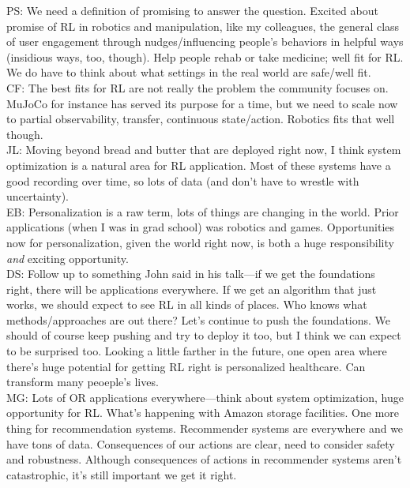 PS: We need a definition of promising to answer the question. Excited about promise of RL in robotics and manipulation, like my colleagues, the general class of user engagement through nudges/influencing people's behaviors in helpful ways (insidious ways, too, though). Help people rehab or take medicine; well fit for RL. We do have to think about what settings in the real world are safe/well fit. \\

CF: The best fits for RL are not really the problem the community focuses on. MuJoCo for instance has served its purpose for a time, but we need to scale now to partial observability, transfer, continuous state/action. Robotics fits that well though. \\

JL: Moving beyond bread and butter that are deployed right now, I think system optimization is a natural area for RL application. Most of these systems have a good recording over time, so lots of data (and don't have to wrestle with uncertainty). \\

EB: Personalization is a raw term, lots of things are changing in the world. Prior applications (when I was in grad school) was robotics and games. Opportunities now for personalization, given the world right now, is both a huge responsibility {\it and} exciting opportunity. \\

DS: Follow up to something John said in his talk---if we get the foundations right, there will be applications everywhere. If we get an algorithm that just works, we should expect to see RL in all kinds of places. Who knows what methods/approaches are out there? Let's continue to push the foundations. We should of course keep pushing and try to deploy it too, but I think we can expect to be surprised too. Looking a little farther in the future, one open area where there's huge potential for getting RL right is personalized healthcare. Can transform many peoeple's lives. \\

MG: Lots of OR applications everywhere---think about system optimization, huge opportunity for RL. What's happening with Amazon storage facilities. One more thing for recommendation systems. Recommender systems are everywhere and we have tons of data. Consequences of our actions are clear, need to consider safety and robustness. Although consequences of actions in recommender systems aren't catastrophic, it's still important we get it right. \\


